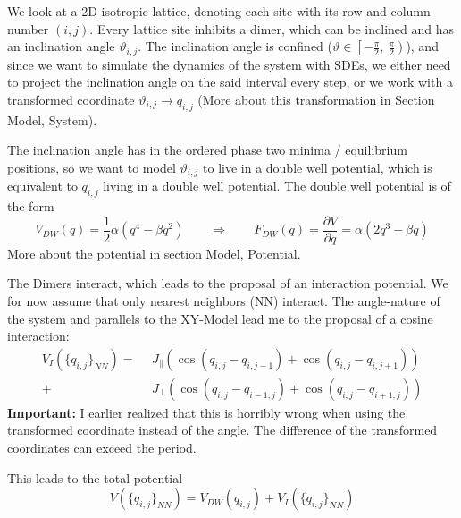 	We look at a 2D isotropic lattice, denoting each site with its row and column number $(i,j)$. Every lattice site inhibits a dimer, which can be inclined and has an inclination angle $\vartheta_{i, j}$. The inclination angle is confined ($\vartheta \in \left[-\frac{\pi}{2}, ~\frac{\pi}{2}\right)$), and since we want to simulate the dynamics of the system with SDEs, we either need to project the inclination angle on the said interval every step, or we work with a transformed coordinate $\vartheta_{i, j} \rightarrow q_{i, j}$ (More about this transformation in Section Model, System).
	
	The inclination angle has in the ordered phase two minima /	equilibrium positions, so we want to model $\vartheta_{i, j}$ to live in a double well potential, which is equivalent to $q_{i, j}$ living in a double well potential. The double well potential is of the form
	\begin{equation}
		V_{DW}(q) = \frac{1}{2}	\alpha \left(q^4 - \beta q^2 \right) \qquad \Rightarrow \qquad 	F_{DW}(q) =	\frac{\partial V}{\partial q} =	\alpha \left(2q^3 - \beta q \right)
	\end{equation}
	More about the potential in section Model, Potential.
	
	The Dimers interact, which leads to the proposal of an interaction potential. We for now assume that only nearest neighbors (NN)  interact. The angle-nature of the system and parallels to the XY-Model lead me to the proposal of a cosine interaction:
	\begin{align}
		V_I(\lbrace q_{i, j}\rbrace_{NN}) =	~~&J_{\parallel} \left(\cos\left( q_{i, j} - q_{i, j-1}   \right) + \cos\left(    q_{i, j} - q_{i, j+1}\right) \right) \\
		+ &J_{\perp} \left(\cos\left( q_{i, j} - q_{i-1, j}   \right) + \cos\left(    q_{i, j} - q_{i+1, j}\right) \right)
	\end{align}
	\textbf{Important:} I earlier realized that this is horribly wrong when using the transformed coordinate instead of the angle. The difference of the transformed coordinates can exceed the period.
	
	This leads to the total potential
	\begin{equation}
		V(\lbrace q_{i, j}\rbrace_{NN}) =	V_{DW}(q_{i, j}) + V_I(\lbrace q_{i, j}\rbrace_{NN})
	\end{equation}
	
